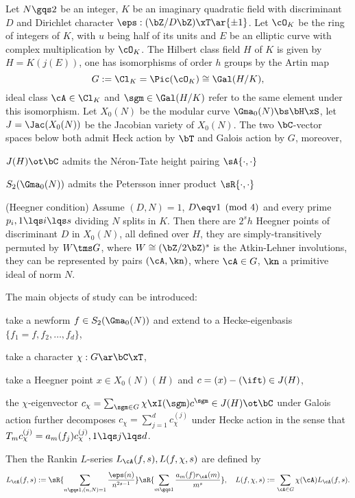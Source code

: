 \documentclass[article, a4paper, twoside]{universal}
\begin{document}
\begin{stp}
	Let $N\gqs2$ be an integer, $K$ be an imaginary quadratic field with discriminant $D$ and Dirichlet character $\eps:(\bZ/D\bZ)\xT\ar\{\pm1\}$. Let $\cO_{K}$ be the ring of integers of $K$, with $u$ being half of its units and $E$ be an elliptic curve with complex multiplication by $\cO_{K}$. The Hilbert class field $H$ of $K$ is given by $H=K(j(E))$, one has isomorphisms of order $h$ groups by the Artin map
	\[
		G:=\Cl_{K}=\Pic(\cO_{K})\cong\Gal(H/K),
	\]
	ideal class $\cA\in\Cl_{K}$ and $\sgm\in\Gal(H/K)$ refer to the same element under this isomorphism. Let $X_{0}(N)$ be the modular curve $\Gma_{0}(N)\bs\bH\xS$, let $J=\Jac(X_{0}(N))$ be the Jacobian variety of $X_{0}(N)$. The two $\bC$-vector spaces below both admit Heck action by $\bT$ and Galois action by $G$, moreover,
	\begin{itm}
		\item $J(H)\ot\bC$ admits the N{\'e}ron-Tate height pairing $\sA{\cdot,\cdot}$
		\item $S_{2}(\Gma_{0}(N))$ admits the Petersson inner product $\sR{\cdot,\cdot}$
	\end{itm}

	(Heegner condition) Assume $(D,N)=1$, $D\eqv1\pmod{4}$ and every prime $p_{i},1\lqs i\lqs s$ dividing $N$ splits in $K$. Then there are $2^{s}h$ Heegner points of discriminant $D$ in $X_{0}(N)$, all defined over $H$, they are simply-transitively permuted by $W\tms G$, where $W\cong(\bZ/2\bZ)^{s}$ is the Atkin-Lehner involutions, they can be represented by pairs $(\cA,\kn)$, where $\cA\in G$, $\kn$ a primitive ideal of norm $N$.

	The main objects of study can be introduced:
	\begin{enr}
		\item take a newform $f\in S_{2}(\Gma_{0}(N))$ and extend to a Hecke-eigenbasis $\{f_{1}=f,f_{2},\ldots,f_{d}\}$,
		\item take a character $\chi:G\ar\bC\xT$,
		\item take a Heegner point $x\in X_{0}(N)(H)$ and $c=(x)-(\ift)\in J(H)$,
	\end{enr}
	the $\chi$-eigenvector $c_{\chi}=\sum_{\sgm\in G}\chi\xI(\sgm)c^{\sgm}\in J(H)\ot\bC$ under Galois action further decomposes $c_{\chi}=\sum_{j=1}^{d}c_{\chi}^{(j)}$ under Hecke action in the sense that $T_{m}c_{\chi}^{(j)}=a_{m}(f_{j})c_{\chi}^{(j)},1\lqs j\lqs d$.

	Then the Rankin $L$-series $L_{\cA}(f,s), L(f,\chi,s)$ are defined by
	\[
		L_{\cA}(f,s):=\sR{\sum_{n\gqs1,(n,N)=1}\frac{\eps(n)}{n^{2s-1}}}\sR{\sum_{m\gqs1}\frac{a_{m}(f)r_{\cA}(m)}{m^{s}}},\quad L(f,\chi,s):=\sum_{\cA\in G}\chi(\cA)L_{\cA}(f,s).
	\]
\end{stp}
\end{document}

